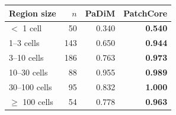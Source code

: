 \begin{tabular}{@{}lrrr@{}}
\toprule
Region size & $n$ & PaDiM & PatchCore \\
\midrule
$<$ 1 cell & 50 & 0.340 & \textbf{0.540} \\
1--3 cells & 143 & 0.650 & \textbf{0.944} \\
3--10 cells & 186 & 0.763 & \textbf{0.973} \\
10--30 cells & 88 & 0.955 & \textbf{0.989} \\
30--100 cells & 95 & 0.832 & \textbf{1.000} \\
$\geq$ 100 cells & 54 & 0.778 & \textbf{0.963} \\
\bottomrule
\end{tabular}
